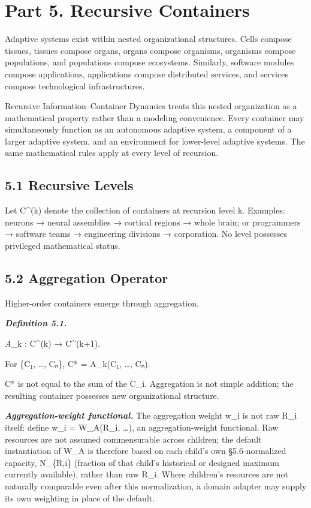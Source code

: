 \documentclass[
]{article}
\begin{document}
\hypertarget{part-5.-recursive-containers}{%
\section{Part 5. Recursive
Containers}\label{part-5.-recursive-containers}}

Adaptive systems exist within nested organizational structures. Cells
compose tissues, tissues compose organs, organs compose organisms,
organisms compose populations, and populations compose ecosystems.
Similarly, software modules compose applications, applications compose
distributed services, and services compose technological
infrastructures.

Recursive Information--Container Dynamics treats this nested
organization as a mathematical property rather than a modeling
convenience. Every container may simultaneously function as an
autonomous adaptive system, a component of a larger adaptive system, and
an environment for lower-level adaptive systems. The same mathematical
rules apply at every level of recursion.

\hypertarget{recursive-levels}{%
\subsection{5.1 Recursive Levels}\label{recursive-levels}}

Let C\^{}(k) denote the collection of containers at recursion level k.
Examples: neurons → neural assemblies → cortical regions → whole brain;
or programmers → software teams → engineering divisions → corporation.
No level possesses privileged mathematical status.

\hypertarget{aggregation-operator}{%
\subsection{5.2 Aggregation Operator}\label{aggregation-operator}}

Higher-order containers emerge through aggregation.

\emph{\textbf{Definition 5.1.}}

\emph{A}\_k : C\^{}(k) → C\^{}(k+1).

For \{C₁, \ldots, Cₙ\}, C* = A\_k(C₁, \ldots, Cₙ).

C* is not equal to the sum of the C\_i. Aggregation is not simple
addition; the resulting container possesses new organizational
structure.

\emph{\textbf{Aggregation-weight functional.}} The aggregation weight
w\_i is not raw R\_i itself: define w\_i = W\_A(R\_i, \ldots), an
aggregation-weight functional. Raw resources are not assumed
commensurable across children; the default instantiation of W\_A is
therefore based on each child's own §5.6-normalized capacity, N\_\{R,i\}
(fraction of that child's historical or designed maximum currently
available), rather than raw R\_i. Where children's resources are not
naturally comparable even after this normalization, a domain adapter may
supply its own weighting in place of the default.
\end{document}
